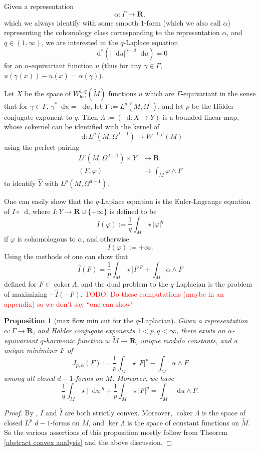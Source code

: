 \documentclass[reqno,11pt]{amsart}
\newcommand{\RR}{\mathbf{R}}
\newcommand*\dif{\mathop{}\!\mathrm{d}}
\DeclareMathOperator{\coker}{coker}
\newcommand{\loc}{\mathrm{loc}}
\newtheorem{proposition}[theorem]{Proposition}
\theoremstyle{definition}
\numberwithin{equation}{section}
\newcommand\todo[1]{\textcolor{red}{TODO: #1}}
\begin{document}
Given a representation
$$\alpha: \Gamma \to \RR,$$
which we always identify with some smooth $1$-form (which we also call $\alpha$) representing the cohomology class corresponding to the representation $\alpha$, and $q \in (1, \infty)$,
we are interested in the $q$-Laplace equation
$$\dif^* (|\dif u|^{q - 2} \dif u) = 0$$
for an $\alpha$-equivariant function $u$ (thus for any $\gamma \in \Gamma$, $u(\gamma(x)) - u(x) = \alpha(\gamma)$).

Let $X$ be the space of $W^{1, q}_\loc(\tilde M)$ functions $u$ which are $\Gamma$-equivariant in the sense that for $\gamma \in \Gamma$, $\gamma^* \dif u = \dif u$, let $Y := L^q(M, \Omega^1)$, and let $p$ be the H\"older conjugate exponent to $q$.
Then $\Lambda := (\dif: X \to Y)$ is a bounded linear map, whose cokernel can be identified with the kernel of
$$\dif: L^p(M, \Omega^{d - 1}) \to W^{-1, p}(M)$$
using the perfect pairing 
\begin{align*}
	L^p(M, \Omega^{d - 1}) \times Y &\to \RR \\
	(F, \varphi) &\mapsto \int_M \varphi \wedge F 
\end{align*}
to identify $\hat Y$ with $L^p(M, \Omega^{d - 1})$.

One can easily show that the $q$-Laplace equation is the Euler-Lagrange equation of $I \circ \dif$, where $I: Y \to \RR \cup \{+\infty\}$ is defined to be 
$$I(\varphi) := \frac{1}{q} \int_M \star |\varphi|^q$$
if $\varphi$ is cohomologous to $\alpha$, and otherwise 
$$I(\varphi) := +\infty.$$
Using the methods of \cite[Chapter I, \S4]{Ekeland99} one can show that
$$\hat I(F) = \frac{1}{p} \int_M \star |F|^p + \int_M \alpha \wedge F$$
defined for $F \in \coker \Lambda$, and the dual problem to the $q$-Laplacian is the problem of maximizing $-\hat I(-F)$.
\todo{Do these computations (maybe in an appendix) so we don't say ``one can show''}

\begin{proposition}[max flow min cut for the $q$-Laplacian]
Given a representation $\alpha: \Gamma \to \RR$, and H\"older conjugate exponents $1 < p, q < \infty$, there exists an $\alpha$-equivariant $q$-harmonic function $u: \tilde M \to \RR$, unique modulo constants, and a unique minimizer $F$ of 
$$J_{p, \alpha}(F) := \frac{1}{p} \int_M \star |F|^p - \int_M \alpha \wedge F$$
among all closed $d - 1$-forms on $M$.
Moreover, we have
\begin{equation}\label{strong duality}
	\frac{1}{q} \int_M \star |\dif u|^q + \frac{1}{p} \int_M \star |F|^p = \int_M \dif u \wedge F.
\end{equation}
\end{proposition}
\begin{proof}
By \cite[Lemma 1]{Loisel_2020}, $I$ and $\hat I$ are both strictly convex.
Moreover, $\coker \Lambda$ is the space of closed $L^p$ $d - 1$-forms on $M$, and $\ker \Lambda$ is the space of constant functions on $\tilde M$.
So the various assertions of this proposition mostly follow from Theorem \ref{abstract convex analysis} and the above discussion.
\end{proof}
\end{document}
